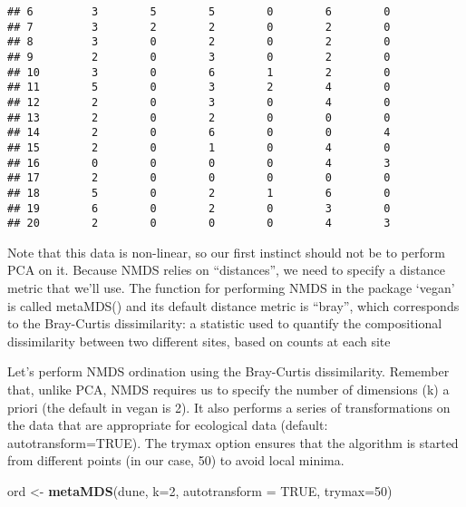 \documentclass[
]{book}
\newenvironment{Shaded}{\begin{snugshade}}{\end{snugshade}}
\newcommand{\DataTypeTok}[1]{\textcolor[rgb]{0.13,0.29,0.53}{#1}}
\newcommand{\DecValTok}[1]{\textcolor[rgb]{0.00,0.00,0.81}{#1}}
\newcommand{\KeywordTok}[1]{\textcolor[rgb]{0.13,0.29,0.53}{\textbf{#1}}}
\newcommand{\NormalTok}[1]{#1}
\newcommand{\OtherTok}[1]{\textcolor[rgb]{0.56,0.35,0.01}{#1}}
\newcommand{\StringTok}[1]{\textcolor[rgb]{0.31,0.60,0.02}{#1}}
\begin{document}
\begin{verbatim}
## 6         3        5        5        0        6        0
## 7         3        2        2        0        2        0
## 8         3        0        2        0        2        0
## 9         2        0        3        0        2        0
## 10        3        0        6        1        2        0
## 11        5        0        3        2        4        0
## 12        2        0        3        0        4        0
## 13        2        0        2        0        0        0
## 14        2        0        6        0        0        4
## 15        2        0        1        0        4        0
## 16        0        0        0        0        4        3
## 17        2        0        0        0        0        0
## 18        5        0        2        1        6        0
## 19        6        0        2        0        3        0
## 20        2        0        0        0        4        3
\end{verbatim}

Note that this data is non-linear, so our first instinct should not be to perform PCA on it. Because NMDS relies on ``distances'', we need to specify a distance metric that we'll use. The function for performing NMDS in the package `vegan' is called metaMDS() and its default distance metric is ``bray'', which corresponds to the Bray-Curtis dissimilarity: a statistic used to quantify the compositional dissimilarity between two different sites, based on counts at each site

Let's perform NMDS ordination using the Bray-Curtis dissimilarity. Remember that, unlike PCA, NMDS requires us to specify the number of dimensions (k) a priori (the default in vegan is 2). It also performs a series of transformations on the data that are appropriate for ecological data (default: autotransform=TRUE). The trymax option ensures that the algorithm is started from different points (in our case, 50) to avoid local minima.

\begin{Shaded}
\begin{Highlighting}[]
\NormalTok{ord \textless{}{-}}\StringTok{ }\KeywordTok{metaMDS}\NormalTok{(dune, }\DataTypeTok{k=}\DecValTok{2}\NormalTok{, }\DataTypeTok{autotransform =} \OtherTok{TRUE}\NormalTok{, }\DataTypeTok{trymax=}\DecValTok{50}\NormalTok{)}
\end{Highlighting}
\end{Shaded}
\end{document}
